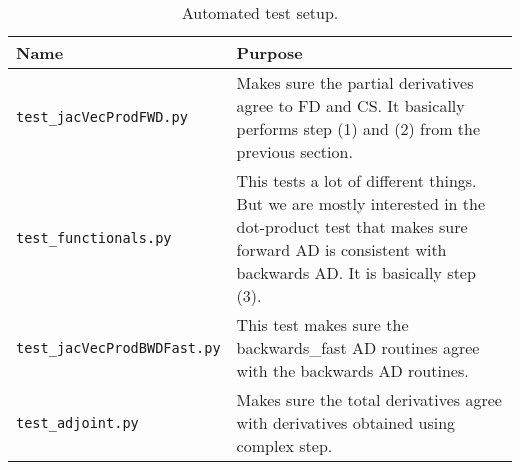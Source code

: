 \begin{table}[H]
    \centering
    \begin{tabular}{l p{}}
        \toprule
        Name                                & Purpose \\
        \midrule
        \texttt{test\_jacVecProdFWD.py}     & Makes sure the partial
            derivatives agree to FD and CS. It basically performs step (1) and
            (2) from the previous section.\\

        \texttt{test\_functionals.py}       & This tests a lot of different
            things. But we are mostly interested in the dot-product test that
            makes sure forward AD is consistent with backwards AD. It is
            basically step (3). \\

        \texttt{test\_jacVecProdBWDFast.py} & This test makes sure the
            backwards\_fast AD routines agree with the backwards AD routines. \\

        \texttt{test\_adjoint.py}            & Makes sure the total derivatives
            agree with derivatives obtained using complex step. \\
        \bottomrule
    \end{tabular}
    \caption{Automated test setup.}
    \label{tab:automated_tests}
\end{table}



